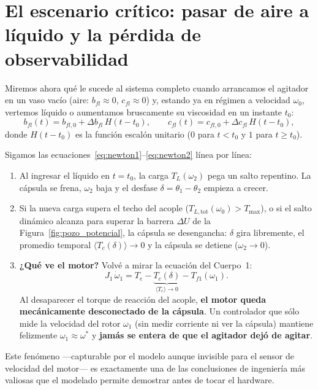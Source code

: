 \documentclass[11pt,a4paper,oneside]{book}
\begin{document}
\section{El escenario crítico: pasar de aire a líquido y la pérdida de observabilidad}

Miremos ahora qué le sucede al sistema completo cuando arrancamos el agitador
en un vaso vacío (aire: $b_{fl}\approx 0$, $c_{fl}\approx 0$) y, estando ya en
régimen a velocidad $\omega_0$, vertemos líquido o aumentamos bruscamente su
viscosidad en un instante $t_0$:
\[
  b_{fl}(t) = b_{fl,0} + \Delta b_{fl}\,H(t - t_0),
  \qquad
  c_{fl}(t) = c_{fl,0} + \Delta c_{fl}\,H(t - t_0),
\]
donde $H(t - t_0)$ es la función escalón unitario ($0$ para $t < t_0$ y $1$ para $t \ge t_0$).

Sigamos las ecuaciones~\eqref{eq:newton1}--\eqref{eq:newton2} línea por línea:
\begin{enumerate}
  \item Al ingresar el líquido en $t = t_0$, la carga $T_L(\omega_2)$ pega un
        salto repentino. La cápsula se frena, $\omega_2$ baja y el desfase
        $\delta = \theta_1 - \theta_2$ empieza a crecer.
  \item Si la nueva carga supera el techo del acople ($T_{L,\text{tot}}(\omega_0) > T_{\max}$),
        o si el salto dinámico alcanza para superar la barrera $\Delta U$ de la
        Figura~\ref{fig:pozo_potencial}, la cápsula se desengancha: $\delta$
        gira libremente, el promedio temporal $\langle T_c(\delta)\rangle \to 0$
        y la cápsula se detiene ($\omega_2 \to 0$).
  \item \textbf{¿Qué ve el motor?} Volvé a mirar la ecuación del Cuerpo~1:
        \[
          J_1\,\dot\omega_1 = T_e - \underbrace{T_c(\delta)}_{\langle T_c\rangle \to 0} - T_{f1}(\omega_1).
        \]
        Al desaparecer el torque de reacción del acople, \textbf{el motor queda
        mecánicamente desconectado de la cápsula}. Un controlador que sólo
        mide la velocidad del rotor $\omega_1$ (sin medir corriente ni ver la
        cápsula) mantiene felizmente $\omega_1 \approx \omega^\ast$ y
        \textbf{jamás se entera de que el agitador dejó de agitar}.
\end{enumerate}

Este fenómeno ---capturable por el modelo aunque invisible para el sensor de
velocidad del motor--- es exactamente una de las conclusiones de ingeniería más
valiosas que el modelado permite demostrar antes de tocar el hardware.
\end{document}
